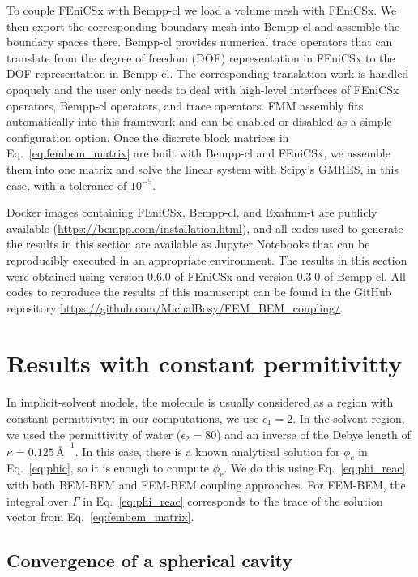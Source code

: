 To couple FEniCSx with Bempp-cl we load a volume mesh with FEniCSx. We then export the corresponding boundary mesh into Bempp-cl and assemble the boundary spaces there. Bempp-cl provides numerical trace operators that can translate from the degree of freedom (DOF) representation in FEniCSx to the DOF representation in Bempp-cl. The corresponding translation work is handled opaquely and the user only needs to deal with high-level interfaces of FEniCSx operators, Bempp-cl operators, and trace operators. FMM assembly fits automatically into this framework and can be enabled or disabled as a simple configuration option.
Once the discrete block matrices in Eq.~\eqref{eq:fembem_matrix} are built with Bempp-cl and FEniCSx, we assemble them into one matrix and solve the linear system with Scipy's\cite{2020SciPy-NMeth} GMRES, in this case, with a tolerance of $10^{-5}$.

Docker images containing FEniCSx, Bempp-cl, and Exafmm-t are publicly available (\url{https://bempp.com/installation.html}), and all codes used to generate the results in this section are available as Jupyter Notebooks that can be reproducibly executed in an appropriate environment. The results in this section were obtained using version 0.6.0 of FEniCSx and version 0.3.0 of Bempp-cl. All codes to reproduce the results of this manuscript can be found in the GitHub repository \url{https://github.com/MichalBosy/FEM_BEM_coupling/}.


\section*{\sffamily \Large Results with constant permitivitty}

In implicit-solvent models, the molecule is usually considered as a region with constant permittivity: in our computations, we use $\epsilon_1=2$.
In the solvent region, we used the permittivity of water ($\epsilon_2=80$) and an inverse of the Debye length of $\kappa=0.125\,\text{\AA}^{-1}$.
In this case, there is a known analytical solution for $\phi_c$ in Eq.~\eqref{eq:phic}, so it is enough to compute $\phi_r$. We do this using Eq.~\eqref{eq:phi_reac} with both BEM-BEM and FEM-BEM coupling approaches. For FEM-BEM, the integral over $\Gamma$ in Eq.~\eqref{eq:phi_reac} corresponds to the trace of the solution vector from Eq.~\eqref{eq:fembem_matrix}.

\subsection*{\sffamily \large Convergence of a spherical cavity}

